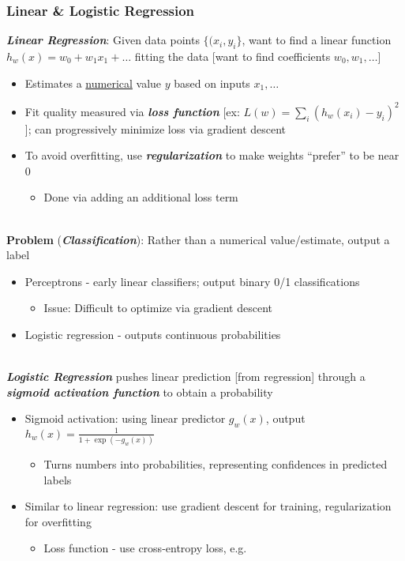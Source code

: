 \documentclass[12pt]{extarticle}
\theoremstyle{definition}
\theoremstyle{remark}
\newcommand{\pstart}[0]{\noindent}
\newcommand{\newp}[0]{~\\ \pstart}
\newcommand{\term}[1]{\noindent\textbf{\textit{#1}}}
\begin{document}
\subsubsection{Linear \& Logistic Regression}
\pstart
\term{Linear Regression}: Given data points $\{(x_i,y_i\}$, want to find a linear function $h_w(x)=w_0+w_1x_1+\hdots$ fitting the data [want to find coefficients $w_0,w_1,\hdots$] \begin{itemize}
    \item Estimates a \ul{numerical} value $y$ based on inputs $x_1,\hdots$
    \item Fit quality measured via \term{loss function} [ex: $L(w)=\sum_i (h_w(x_i)-y_i)^2$]; can progressively minimize loss via gradient descent
    \item To avoid overfitting, use \term{regularization} to make weights ``prefer'' to be near 0 \begin{itemize}
        \item Done via adding an additional loss term
    \end{itemize}
\end{itemize}

\newp
\textbf{Problem} (\term{Classification}): Rather than a numerical value/estimate, output a label \begin{itemize}
    \item Perceptrons - early linear classifiers; output binary 0/1 classifications \begin{itemize}
        \item Issue: Difficult to optimize via gradient descent
    \end{itemize}
    \item Logistic regression - outputs continuous probabilities
\end{itemize}

\newp
\term{Logistic Regression} pushes linear prediction [from regression] through a \term{sigmoid activation function} to obtain a probability \begin{itemize}
    \item Sigmoid activation: using linear predictor $g_w(x)$, output $h_w(x)=\frac{1}{1+\exp(-g_w(x))}$ \begin{itemize}
        \item Turns numbers into probabilities, representing confidences in predicted labels
    \end{itemize}
    \item Similar to linear regression: use gradient descent for training, regularization for overfitting \begin{itemize}
        \item Loss function - use cross-entropy loss, e.g.
    \end{itemize}
\end{itemize}
\end{document}
